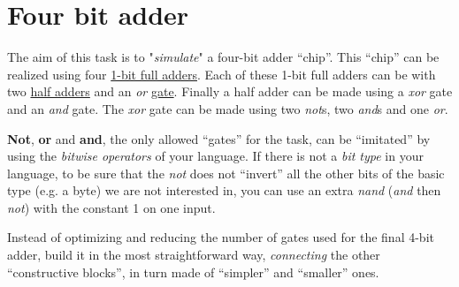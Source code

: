 \pagebreak{}
\section*{Four bit adder}

The aim of this task is to "\emph{simulate}" a four-bit adder ``chip''.
This ``chip'' can be realized using four
\href{http://en.wikipedia.org/wiki/Adder\_(electronics)\#Full\_adder}{1-bit
full adders}. Each of these 1-bit full adders can be with two
\href{http://en.wikipedia.org/wiki/Adder\_(electronics)\#Half\_adder}{half
adders} and an \emph{or}
\href{http://en.wikipedia.org/wiki/Logic\_gate}{gate}. Finally a half
adder can be made using a \emph{xor} gate and an \emph{and} gate. The
\emph{xor} gate can be made using two \emph{not}s, two \emph{and}s and
one \emph{or}.

\textbf{Not}, \textbf{or} and \textbf{and}, the only allowed ``gates''
for the task, can be ``imitated'' by using the \emph{bitwise
  operators} of your language. If there is not a \emph{bit type} in
your language, to be sure that the \emph{not} does not ``invert'' all
the other bits of the basic type (e.g. a byte) we are not interested
in, you can use an extra \emph{nand} (\emph{and} then \emph{not}) with
the constant 1 on one input.

Instead of optimizing and reducing the number of gates used for the
final 4-bit adder, build it in the most straightforward way,
\emph{connecting} the other ``constructive blocks'', in turn made of
``simpler'' and ``smaller'' ones.


